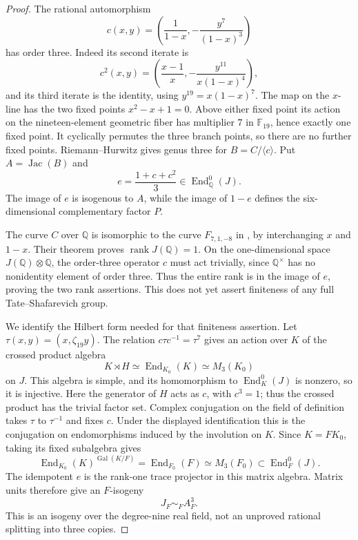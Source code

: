 \begin{proof}
The rational automorphism
\[
 c(x,y)=\left(\frac1{1-x},-\frac{y^7}{(1-x)^3}\right)
\]
has order three.  Indeed its second iterate is
\[
 c^2(x,y)=\left(\frac{x-1}{x},
                 -\frac{y^{11}}{x(1-x)^4}\right),
\]
and its third iterate is the identity, using $y^{19}=x(1-x)^7$.
The map on the $x$-line has the two fixed points
$x^2-x+1=0$.  Above either fixed point its action on the
nineteen-element geometric fiber has multiplier $7$ in
$\mathbb F_{19}$, hence exactly one fixed point.  It cyclically
permutes the three branch points, so there are no further fixed
points.  Riemann--Hurwitz gives genus three for
$B=C/\langle c\rangle$.  Put $A=\operatorname{Jac}(B)$ and
\[
 e=\frac{1+c+c^2}{3}\in\operatorname{End}^0_{\mathbb Q}(J).
\]
The image of $e$ is isogenous to $A$, while the image of $1-e$
defines the six-dimensional complementary factor $P$.

The curve $C$ over $\mathbb Q$ is isomorphic to the curve
$F_{7,1,-8}$ in \citet[Theorem~1.6(2), author p.~3]{McCallumTzermias2004},
by interchanging $x$ and $1-x$. Their theorem proves
$\operatorname{rank}J(\mathbb Q)=1$.
On the one-dimensional space $J(\mathbb Q)\otimes\mathbb Q$,
the order-three operator $c$ must act trivially, since
$\mathbb Q^\times$ has no nonidentity element of order three.
Thus the entire rank is in the image of $e$, proving the two
rank assertions.  This does not yet assert finiteness of any
full Tate--Shafarevich group.

We identify the Hilbert form needed for that finiteness assertion.
Let $\tau(x,y)=(x,\zeta_{19}y)$.  The relation
$c\tau c^{-1}=\tau^7$ gives an action over $K$ of the crossed
product algebra
\[
 K\rtimes H\simeq\operatorname{End}_{K_0}(K)
                  \simeq M_3(K_0)
\]
on $J$.  This algebra is simple, and its homomorphism to
$\operatorname{End}^0_K(J)$ is nonzero, so it is injective.
Here the generator of $H$ acts as $c$, with $c^3=1$; thus the
crossed product has the trivial factor set.
Complex conjugation on the field of definition takes
$\tau$ to $\tau^{-1}$ and fixes $c$.  Under the displayed
identification this is the conjugation on endomorphisms induced
by the involution on $K$.  Since $K=FK_0$, taking its fixed
subalgebra gives
\[
 \operatorname{End}_{K_0}(K)^{\operatorname{Gal}(K/F)}
       =\operatorname{End}_{F_0}(F)\simeq M_3(F_0)
       \subset\operatorname{End}^0_F(J).
\]
The idempotent $e$ is the rank-one trace projector in this
matrix algebra.  Matrix units therefore give an $F$-isogeny
\[
 J_F\sim_F A_F^3.
\]
This is an isogeny over the degree-nine real field, not an
unproved rational splitting into three copies.


\end{proof}
